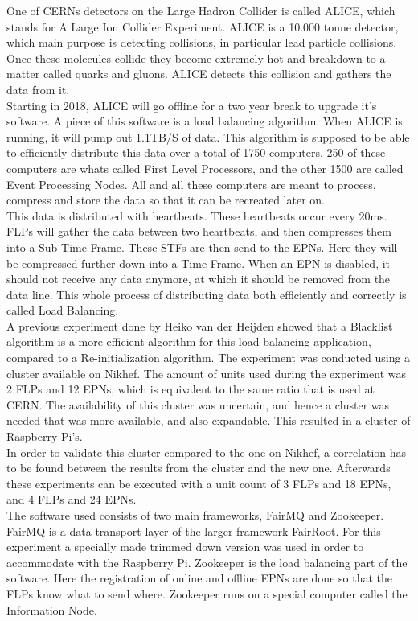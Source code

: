 One of CERNs detectors on the Large Hadron Collider is called ALICE, which stands for A Large Ion Collider Experiment. ALICE is a 10.000 tonne detector, which main purpose is detecting collisions, in particular lead particle collisions. Once these molecules collide they become extremely hot and breakdown to a matter called quarks and gluons. ALICE detects this collision and gathers the data from it. \\
Starting in 2018, ALICE will go offline for a two year break to upgrade it's software. A piece of this software is a load balancing algorithm. When ALICE is running, it will pump out 1.1TB/S of data. This algorithm is supposed to be able to efficiently distribute this data over a total of 1750 computers. 250 of these computers are whats called First Level Processors, and the other 1500 are called Event Processing Nodes. All and all these computers are meant to process, compress and store the data so that it can be recreated later on. \\
This data is distributed with heartbeats. These heartbeats occur every 20ms. FLPs will gather the data between two heartbeats, and then compresses them into a Sub Time Frame. These STFs are then send to the EPNs. Here they will be compressed further down into a Time Frame. When an EPN is disabled, it should not receive any data anymore, at which it should be removed from the data line. This whole process of distributing data both efficiently and correctly is called Load Balancing. \\

A previous experiment done by Heiko van der Heijden showed that a Blacklist algorithm is a more efficient algorithm for this load balancing application, compared to a Re-initialization algorithm. The experiment was conducted using a cluster available on Nikhef. The amount of units used during the experiment was 2 FLPs and 12 EPNs, which is equivalent to the same ratio that is used at CERN. The availability of this cluster was uncertain, and hence a cluster was needed that was more available, and also expandable. This resulted in a cluster of Raspberry Pi's. \\

In order to validate this cluster compared to the one on Nikhef, a correlation has to be found between the results from the cluster and the new one. Afterwards these experiments can be executed with a unit count of 3 FLPs and 18 EPNs, and 4 FLPs and 24 EPNs. \\

The software used consists of two main frameworks, FairMQ and Zookeeper. FairMQ is a data transport layer of the larger framework FairRoot. For this experiment a specially made trimmed down version was used in order to accommodate with the Raspberry Pi. Zookeeper is the load balancing part of the software. Here the registration of online and offline EPNs are done so that the FLPs know what to send where. Zookeeper runs on a special computer called the Information Node. \\

